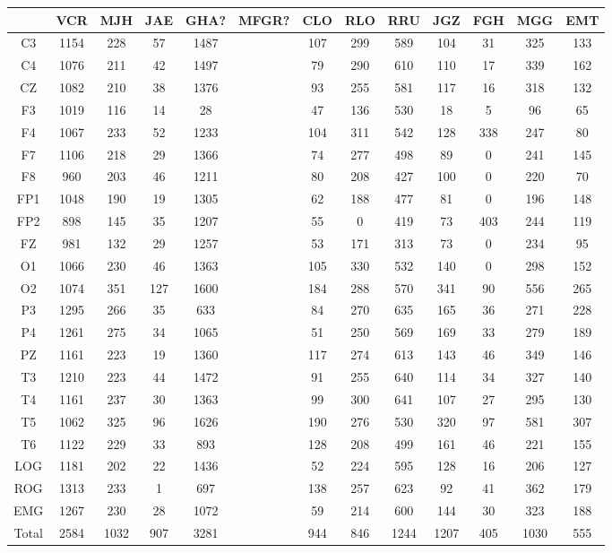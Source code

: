 \begin{SidewaysFigure}
\centering
\begin{tabular}{c|ccccc|cccc|ccc}
& VCR & MJH & JAE & GHA? & MFGR?
& CLO & RLO & RRU & JGZ
& FGH & MGG & EMT \\
\hline
C3 &1154&228&57&1487&&107&299&589&104&31&325&133 \\
C4 &1076&211&42&1497&&79&290&610&110&17&339&162 \\
CZ &1082&210&38&1376&&93&255&581&117&16&318&132 \\
F3 &1019&116&14&28&&47&136&530&18&5&96&65 \\
F4 &1067&233&52&1233&&104&311&542&128&338&247&80 \\
F7 &1106&218&29&1366&&74&277&498&89&0&241&145 \\
F8 &960&203&46&1211&&80&208&427&100&0&220&70 \\
FP1 &1048&190&19&1305&&62&188&477&81&0&196&148 \\
FP2 &898&145&35&1207&&55&0&419&73&403&244&119 \\
FZ &981&132&29&1257&&53&171&313&73&0&234&95 \\
O1 &1066&230&46&1363&&105&330&532&140&0&298&152 \\
O2 &1074&351&127&1600&&184&288&570&341&90&556&265 \\
P3 &1295&266&35&633&&84&270&635&165&36&271&228 \\
P4 &1261&275&34&1065&&51&250&569&169&33&279&189 \\
PZ &1161&223&19&1360&&117&274&613&143&46&349&146 \\
T3 &1210&223&44&1472&&91&255&640&114&34&327&140 \\
T4 &1161&237&30&1363&&99&300&641&107&27&295&130 \\
T5 &1062&325&96&1626&&190&276&530&320&97&581&307 \\
T6 &1122&229&33&893&&128&208&499&161&46&221&155 \\
LOG &1181&202&22&1436&&52&224&595&128&16&206&127 \\
ROG &1313&233&1&697&&138&257&623&92&41&362&179 \\
EMG &1267&230&28&1072&&59&214&600&144&30&323&188 \\
\hline
Total&2584&1032&907&3281&&944&846&1244&1207&405&1030&555
\end{tabular}
\caption{Total de \'epocas PE clasificadas como sue\~no MOR 
(fase R) para cada
canal. %
}
\label{total_gpos_mor}
\end{SidewaysFigure}


